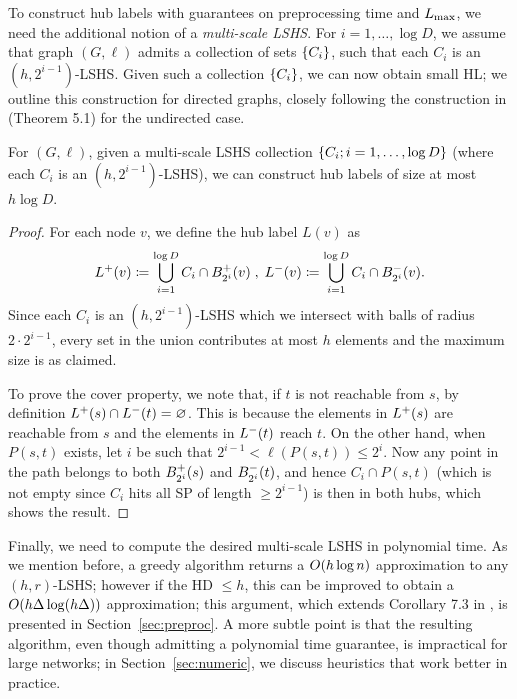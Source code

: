 To construct hub labels with guarantees on preprocessing time and $\Lm$, we need the additional notion of a \emph{multi-scale LSHS}. 
For $i=1,\ldots,\log D$, we assume that graph $(G,\ell)$ admits a collection of sets $\crl*{C_i}$, such that each $C_i$ is an $(h,2^{i-1})$-LSHS.
Given such a collection $\crl*{C_i}$, we can now obtain small HL; we outline this construction for directed graphs, closely following the construction in \cite{highway2013} (Theorem 5.1) for the undirected case.
\begin{proposition}
\label{theo:construct_hl}
For $(G,\ell)$, given a multi-scale LSHS collection $\crl*{C_i;i=1,\ldots,\log D}$ (where each $C_i$ is an $(h,2^{i-1})$-LSHS), we can construct hub labels of size at most $h\log D$.
\end{proposition}
\begin{proof}
For each node $v$, we define the hub label $L(v)$ as
\begin{align*}
\Lf(v)\defeq  \bigcup_{i=1}^{\log D}C_i\cap \Bf_{2^i}(v)\;,\;
\Lb(v)\defeq \bigcup_{i=1}^{\log D}C_i\cap \Bb_{2^i}(v).
\end{align*}
Since each $C_i$ is an $(h,2^{i-1})$-LSHS which we intersect with balls of radius $2\cdot 2^{i-1}$, every set in the union contributes at most $h$ elements and the maximum size is as claimed.

To prove the cover property, we note that, if $t$ is not reachable from $s$, by definition $\Lf(s)\cap\Lb(t)=\varnothing$.
This is because the elements in $\Lf(s)$ are reachable from $s$ and the elements in $\Lb(t)$ reach $t$.
On the other hand, when $P(s,t)$ exists, let $i$ be such that $2^{i-1}<\ell(P(s,t))\leq 2^i$.
Now any point in the path belongs to both $\Bf_{2^i}(s)$ and $\Bb_{2^i}(t)$, and hence $C_i\cap P(s,t)$  (which is not empty since $C_i$ hits all SP of length $\geq 2^{i-1}$) is then in both hubs, which shows the result.
\end{proof}


Finally, we need to compute the desired multi-scale LSHS in polynomial time.
As we mention before, a greedy algorithm returns a $\Or(h\log n)$ approximation to any $(h,r)$-LSHS; however if the HD $\leq h$, this can be improved to obtain a $\Or(h\Delta\log(h\Delta))$ approximation; this argument, which extends Corollary 7.3 in \cite{highway2013}, is presented in Section~\ref{sec:preproc}.
A more subtle point is that the resulting algorithm, even though admitting a polynomial time guarantee, is impractical for large networks; in Section~\ref{sec:numeric}, we discuss heuristics that work better in practice.


